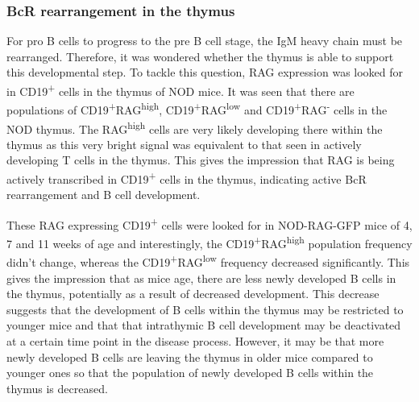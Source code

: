 \subsubsection{BcR rearrangement in the thymus}


For pro B cells to progress to the pre B cell stage, the IgM heavy chain must be rearranged.
Therefore, it was wondered whether the thymus is able to support this developmental step.
To tackle this question, RAG expression was looked for in CD19\textsuperscript{+} cells in the thymus of NOD mice.
It was seen that there are populations of CD19\textsuperscript{+}RAG\textsuperscript{high}, CD19\textsuperscript{+}RAG\textsuperscript{low} and CD19\textsuperscript{+}RAG\textsuperscript{-} cells in the NOD thymus.
The RAG\textsuperscript{high} cells are very likely developing there within the thymus as this very bright signal was equivalent to that seen in actively developing T cells in the thymus.
This gives the impression that RAG is being actively transcribed in CD19\textsuperscript{+} cells in the thymus, indicating active BcR rearrangement and B cell development.

These RAG expressing CD19\textsuperscript{+} cells were looked for in NOD-RAG-GFP mice of 4, 7 and 11 weeks of age and interestingly, the CD19\textsuperscript{+}RAG\textsuperscript{high} population frequency didn't change, whereas the CD19\textsuperscript{+}RAG\textsuperscript{low} frequency decreased significantly.
This gives the impression that as mice age, there are less newly developed B cells in the thymus, potentially as a result of decreased development.
This decrease suggests that the development of B cells within the thymus may be restricted to younger mice and that that intrathymic B cell development may be deactivated at a certain time point in the disease process.
However, it may be that more newly developed B cells are leaving the thymus in older mice compared to younger ones so that the population of newly developed B cells within the thymus is decreased.


